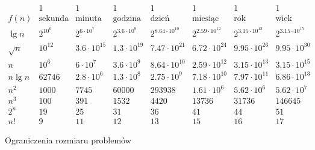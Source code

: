 \begin{table}[h]
	\begin{scriptsize}
		\[
			\begin{array}{c|c|c|c|c|c|c|c}
				&1&1&1&1&1&1&1 \\
				f(n) & \mbox{sekunda} & \mbox{minuta} & \mbox{godzina} & \mbox{dzień} & \mbox{miesiąc} & \mbox{rok} & \mbox{wiek} \\
				\hline
				\lg n~& 2^{10^6} & 2^{6\cdot 10^7} & 2^{3.6\cdot 10^9} & 2^{8.64\cdot 10^{10}} & 2^{2.59\cdot 10^{12}} & 2^{3.15\cdot 10^{13}} & 2^{3.15\cdot 10^{15}} \\
				\hline
				\sqrt{n} & 10^{12} & 3.6\cdot 10^{15} & 1.3\cdot 10^{19} & 7.47\cdot 10^{21} & 6.72\cdot 10^{24} & 9.95\cdot 10^{26} & 9.95\cdot 10^{30} \\
				\hline
				n & 10^6 & 6\cdot 10^7 & 3.6\cdot 10^9 & 8.64\cdot 10^{10} & 2.59\cdot 10^{12} & 3.15\cdot 10^{13} & 3.15\cdot 10^{15} \\
				\hline
				n\lg n~& 62746 & 2.8\cdot 10^6 & 1.3\cdot 10^8 & 2.75\cdot 10^9 & 7.18\cdot 10^{10} & 7.97\cdot 10^{11} & 6.86\cdot 10^{13} \\
				\hline
				n^2 & 1000 & 7745 & 60000 & 293938 & 1.61\cdot 10^6 & 5.62\cdot 10^6 & 5.62\cdot 10^7 \\
				\hline
				n^3 & 100 & 391 & 1532 & 4420 & 13736 & 31736 & 146645 \\
				\hline
				2^n & 19 & 25 & 31 & 36 & 41 & 44 & 51 \\
				\hline
				n! & 9~& 11 & 12 & 13 & 15 & 16 & 17
			\end{array}
		\]
	\end{scriptsize}
	\caption{Ograniczenia rozmiaru problemów}
\end{table}
